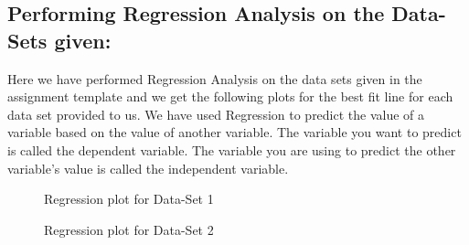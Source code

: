 \documentclass[12pt,a4paper]{article}
\begin{document}
\subsection{Performing Regression Analysis on the Data-Sets given:}
Here we have performed Regression Analysis on the data sets given in the assignment template and we get the following plots for the best fit line for each data set provided to us. We have used Regression to predict the value of a variable based on the value of another variable. The variable you want to predict is called the dependent variable. The variable you are using to predict the other variable's value is called the independent variable.
\begin{figure}[!ht]
	\begin{center}
	\end{center}
	\caption{Regression plot for Data-Set 1}
\end{figure}
\begin{figure}[!ht]
	\begin{center}
	\end{center}
	\caption{Regression plot for Data-Set 2}
\end{figure}
\clearpage
\end{document}
